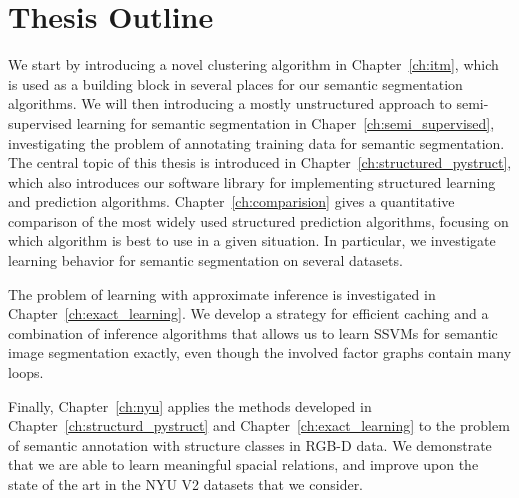 \section{Thesis Outline}
We start by introducing a novel clustering algorithm in Chapter~\ref{ch:itm},
which is used as a building block in several places for our semantic
segmentation algorithms.  We will then introducing a mostly unstructured
approach to semi-supervised learning for semantic segmentation in
Chaper~\ref{ch:semi_supervised}, investigating the problem of annotating
training data for semantic segmentation.  The central topic of this thesis is
introduced in Chapter~\ref{ch:structured_pystruct}, which also introduces our
software library for implementing structured learning and prediction
algorithms.
Chapter~\ref{ch:comparision} gives a quantitative comparison of the most widely
used structured prediction algorithms, focusing on which algorithm is best to
use in a given situation. In particular, we investigate learning behavior for
semantic segmentation on several datasets.

The problem of learning with approximate inference is investigated in
Chapter~\ref{ch:exact_learning}.  We develop a strategy for efficient caching
and a combination of inference algorithms that allows us to learn SSVMs for
semantic image segmentation exactly, even though the involved factor graphs
contain many loops.

Finally, Chapter~\ref{ch:nyu} applies the methods developed in
Chapter~\ref{ch:structurd_pystruct} and Chapter~\ref{ch:exact_learning} to the
problem of semantic annotation with structure classes in RGB-D data. We
demonstrate that we are able to learn meaningful spacial relations, and improve
upon the state of the art in the NYU V2 datasets that we consider.

